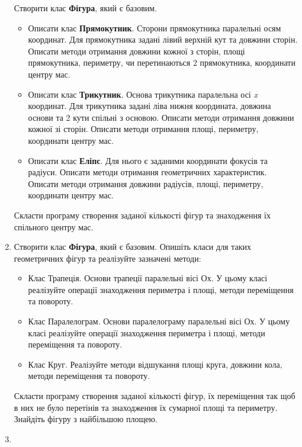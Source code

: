 \documentclass[]{article}
\begin{document}
\begin{enumerate}
Створити клас \textbf{Фігура}, який є базовим.
\begin{itemize}
\item
Описати клас \textbf{Прямокутник}. Сторони прямокутника паралельні осям
координат. Для прямокутника задані лівий верхній кут та довжини сторін.
Описати методи отримання довжини кожної з сторін, площі прямокутника,
периметру, чи перетинаються 2 прямокутника, координати центру мас. 
\item
Описати клас \textbf{Трикутник}. Основа трикутника паралельна осі
\emph{x} координат. Для трикутника задані ліва нижня координата,
довжина основи та 2 кути спільні з основою. Описати методи отримання довжини кожної зі сторін.
Описати методи отримання площі, периметру, координати центру мас.  
\item
Описати клас \textbf{Еліпс}. Для нього є заданими координати фокусів та радіуси.
Описати методи отримання геометричних характеристик. Описати методи
отримання довжини радіусів, площі, периметру, координати центру мас. 
\end{itemize}

Скласти програму створення заданої кількості фігур та знаходження їх спільного центру мас.


\item
Створити клас \textbf{Фігура}, який є базовим.  Опишіть класи для 
таких геометричних фігур та реалізуйте зазначені методи:
\begin{itemize}
\item
  Клас Трапеція. Основи трапеції паралельні вісі Ох. У цьому класі реалізуйте операції 
знаходження периметра і площі, методи переміщення та повороту.
\item
  Клас Паралелограм. Основи паралелограму паралельні вісі Ох. 
У цьому класі реалізуйте операції знаходження периметра і площі, 
методи переміщення та повороту.
\item
  Клас Круг. Реалізуйте методи відшукання площі круга, довжини кола,
  методи переміщення та повороту.
\end{itemize}
Скласти програму створення заданої кількості фігур, їх переміщення так щоб в них не було
перетінів та знаходження їх сумарної площі та периметру. 
Знайдіть фігуру з найбільшою площею.


\item


\end{enumerate}
\end{document}
